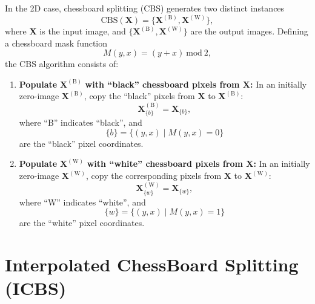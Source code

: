 \documentclass{article}
\begin{document}
In the 2D case, chessboard splitting (CBS) generates two distinct
instances
\begin{equation}
  \mathrm{CBS}(\mathbf{X})=\{\mathbf{X}^{(\text{B})},\mathbf{X}^{(\text{W})}\},
\end{equation}
where $\mathbf{X}$ is the input image, and
$\{\mathbf{X}^{(\text{B})},\mathbf{X}^{(\text{W})}\}$ are the output
images. Defining a chessboard mask function
\begin{equation}
  M(y,x)=(y+x)~\text{mod}~2,
\end{equation}
the CBS algorithm consists of:
\begin{enumerate}
\item \textbf{Populate} $\mathbf{X}^{(\text{B})}$ \textbf{with
    ``black'' chessboard pixels from $\mathbf{X}$:} In an initially
  zero-image $\mathbf{X}^{(\text{B})}$, copy the ``black'' pixels from
  $\mathbf{X}$ to $\mathbf{X}^{(\text{B})}$:
  \begin{equation}
    \mathbf{X}^{(\text{B})}_{\{b\}} = \mathbf{X}_{\{b\}},
    \label{eq:copy_blacks}
  \end{equation}
  where ``B'' indicates ``black'', and
  \begin{equation}
    \{b\} = \{(y, x) \mid M(y, x)=0\}
    \label{eq:black_pixels}
  \end{equation}
  are the ``black'' pixel coordinates.
  
\item \textbf{Populate} $\mathbf{X}^{(\text{W})}$ \textbf{with
    ``white'' chessboard pixels from $\mathbf{X}$:} In an initially
  zero-image $\mathbf{X}^{(\text{W})}$, copy the corresponding pixels
  from $\mathbf{X}$ to $\mathbf{X}^{(\text{W})}$:
  \begin{equation}
    \mathbf{X}^{(\text{W})}_{\{w\}} = \mathbf{X}_{\{w\}},
    \label{eq:copy_whites}
  \end{equation}
  where ``W'' indicates ``white'', and
  \begin{equation}
    \{w\} = \{(y, x) \mid M(y, x)=1\}
    \label{eq:white_pixels}
  \end{equation}
  are the ``white'' pixel coordinates.
  
\end{enumerate}


\section{Interpolated ChessBoard Splitting (ICBS)}
\label{sec:ICBS}
\end{document}
